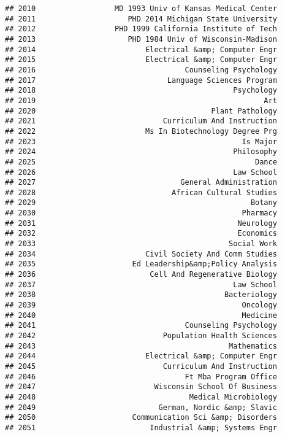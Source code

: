 \documentclass[
]{article}
\begin{document}
\begin{verbatim}
## 2010                  MD 1993 Univ of Kansas Medical Center
## 2011                     PHD 2014 Michigan State University
## 2012                  PHD 1999 California Institute of Tech
## 2013                     PHD 1984 Univ of Wisconsin-Madison
## 2014                         Electrical &amp; Computer Engr
## 2015                         Electrical &amp; Computer Engr
## 2016                                  Counseling Psychology
## 2017                              Language Sciences Program
## 2018                                             Psychology
## 2019                                                    Art
## 2020                                        Plant Pathology
## 2021                             Curriculum And Instruction
## 2022                         Ms In Biotechnology Degree Prg
## 2023                                               Is Major
## 2024                                             Philosophy
## 2025                                                  Dance
## 2026                                             Law School
## 2027                                 General Administration
## 2028                               African Cultural Studies
## 2029                                                 Botany
## 2030                                               Pharmacy
## 2031                                              Neurology
## 2032                                              Economics
## 2033                                            Social Work
## 2034                         Civil Society And Comm Studies
## 2035                      Ed Leadership&amp;Policy Analysis
## 2036                          Cell And Regenerative Biology
## 2037                                             Law School
## 2038                                           Bacteriology
## 2039                                               Oncology
## 2040                                               Medicine
## 2041                                  Counseling Psychology
## 2042                             Population Health Sciences
## 2043                                            Mathematics
## 2044                         Electrical &amp; Computer Engr
## 2045                             Curriculum And Instruction
## 2046                                  Ft Mba Program Office
## 2047                           Wisconsin School Of Business
## 2048                                   Medical Microbiology
## 2049                            German, Nordic &amp; Slavic
## 2050                      Communication Sci &amp; Disorders
## 2051                          Industrial &amp; Systems Engr

\end{verbatim}
\end{document}
